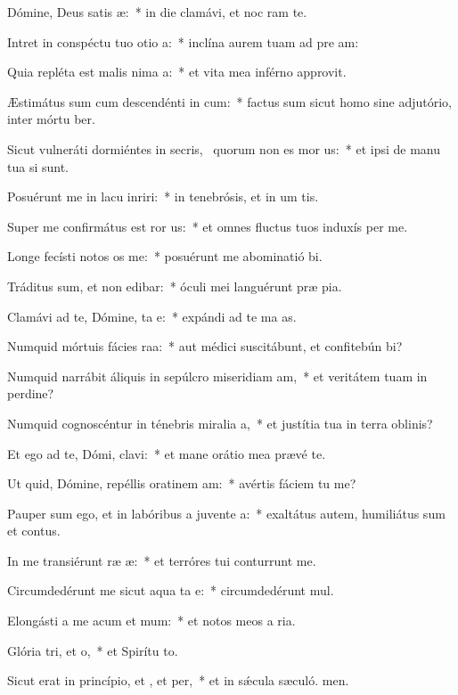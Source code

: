 \item Dómine, Deus satis æ:~* in die clamávi, et noc ram te.
\item Intret in conspéctu tuo otio a:~* inclína aurem tuam ad pre am:
\item Quia repléta est malis nima a:~* et vita mea inférno approvit.
\item Æstimátus sum cum descendénti in cum:~* factus sum sicut homo sine adjutório, inter mórtu ber.
\item Sicut vulneráti dormiéntes in secris,~\pscross{} quorum non es mor us:~* et ipsi de manu tua si sunt.
\item Posuérunt me in lacu inriri:~* in tenebrósis, et in um tis.
\item Super me confirmátus est ror us:~* et omnes fluctus tuos induxís per me.
\item Longe fecísti notos os  me:~* posuérunt me abominatió bi.
\item Tráditus sum, et non edibar:~* óculi mei languérunt præ pia.
\item Clamávi ad te, Dómine, ta e:~* expándi ad te ma as.
\item Numquid mórtuis fácies raa:~* aut médici suscitábunt, et confitebún bi?
\item Numquid narrábit áliquis in sepúlcro miseridiam am,~* et veritátem tuam in perdine?
\item Numquid cognoscéntur in ténebris miralia a,~* et justítia tua in terra oblinis?
\item Et ego ad te, Dómi, clavi:~* et mane orátio mea prævé te.
\item Ut quid, Dómine, repéllis oratinem am:~* avértis fáciem tu  me?
\item Pauper sum ego, et in labóribus a juvente a:~* exaltátus autem, humiliátus sum et contus.
\item In me transiérunt ræ æ:~* et terróres tui conturrunt me.
\item Circumdedérunt me sicut aqua ta e:~* circumdedérunt  mul.
\item Elongásti a me acum et mum:~* et notos meos a ria.
\item Glória tri, et o,~* et Spirítu to.
\item Sicut erat in princípio, et , et per,~* et in sǽcula sæculó. men.
